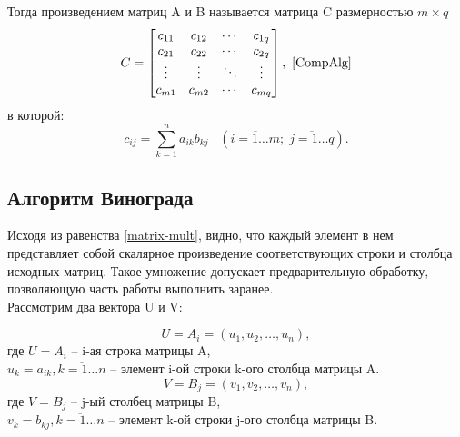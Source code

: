 \documentclass[12pt, a4paper]{report}
\begin{document}
	Тогда произведением матриц A и B называется матрица C размерностью  $m \times q$ 
	\begin{equation}
	\label{matrix-mult}
	C = \begin{bmatrix} 
	c_{11} & c_{12} & \cdots & c_{1q} \\
	c_{21} & c_{22} & \cdots & c_{2q} \\ 
	\vdots & \vdots & \ddots & \vdots \\ 
	c_{m1} & c_{m2} & \cdots & c_{mq}	
	\end{bmatrix}, ~\cite{CompAlg}
	\end{equation}
	в которой:
	$$c_{ij} = \sum_{k=1}^n a_{ik}b_{kj} \;\;\; \left(\overline{i = 1 \ldots m};\;\overline{j = 1 \ldots q} \right).$$

	\subsection{Алгоритм Винограда}
	Исходя из равенства \ref{matrix-mult}, видно, что каждый элемент в нем представляет собой скалярное произведение соответствующих строки и столбца исходных матриц. Такое умножение допускает предварительную обработку, позволяющую часть работы выполнить заранее. ~\cite{Winograd}\\
	Рассмотрим два вектора U и V:
	
	\begin{equation}
	\label{u-def}
	U = A_{i} = (u_{1}, u_{2}, \ldots, u_{n}),
	\end{equation}
	где $U = A_{i}$ -- i-ая строка матрицы A,\\
	$u_{k} = a_{ik}, \overline{k = 1 \ldots n}$ -- элемент i-ой строки k-ого столбца матрицы A.\\
	
	\begin{equation}
	\label{v-def}
	V = B_{j} = (v_{1}, v_{2}, \ldots, v_{n}),
	\end{equation}
	где $V = B_{j}$ -- j-ый столбец матрицы B,\\
	$v_{k} = b_{kj}, \overline{k = 1 \ldots n}$ -- элемент k-ой строки j-ого столбца матрицы B.\\
	
\end{document}
